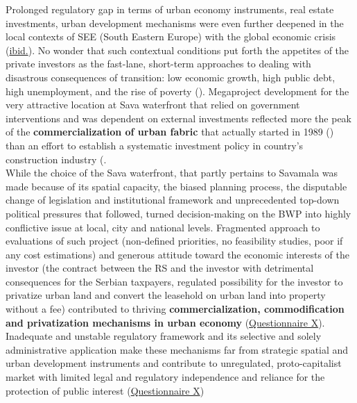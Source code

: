 \documentclass[11pt]{report}
\begin{document}
Prolonged regulatory gap in terms of urban economy instruments, real estate investments, urban development mechanisms were even further deepened in the local contexts of SEE (South Eastern Europe) with the global economic crisis 
(\href{Zekovic}{ibid.}).
No wonder that such contextual conditions put forth the appetites of the private investors as the fast-lane, short-term approaches to dealing with disastrous consequences of transition: low economic growth, high public debt, high unemployment, and the rise of poverty (\href{ref}{\citealt{world_bank_cities_2000}}).
Megaproject development for the very attractive location at Sava waterfront that relied on government interventions and was dependent on external investments reflected more the peak of the \textbf{commercialization of urban fabric} that actually started in 1989 (\href{ref}{\citealt{hirt_belgrade_2009}}) than an effort to establish a systematic investment policy in country's construction industry (\cite{WorldBank2013}.
\\

While the choice of the Sava waterfront, that partly pertains to Savamala was made because of its spatial capacity, the biased planning process, the disputable change of legislation and institutional framework and unprecedented top-down political pressures that followed, turned decision-making on the BWP into highly conflictive issue at local, city and national levels.
Fragmented approach to evaluations of such project (non-defined priorities, no feasibility studies, poor if any cost estimations) and generous attitude toward the economic interests of the investor (the contract between the RS and the investor with detrimental consequences for the Serbian taxpayers, regulated possibility for the investor to privatize urban land and convert the leasehold on urban land into property without a fee) contributed to thriving \textbf{commercialization, commodification and privatization mechanisms in urban economy}
(\href{Questionnaire Experts Savamala}{Questionnaire X}).
Inadequate and unstable regulatory framework and its selective and solely administrative application make these mechanisms far from strategic spatial and urban development instruments and contribute to unregulated, proto-capitalist market with limited legal and regulatory independence and reliance for the protection of public interest
(\href{Questionnaire Experts Savamala}{Questionnaire X})
\\
\end{document}
